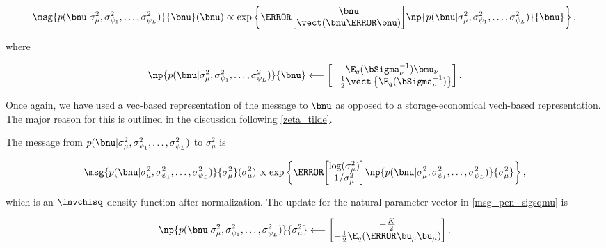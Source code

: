 \documentclass[12pt]{article}
\def\Sigmanu{\bSigma_{\nu}}
\def\munu{\bmu_{\nu}}
\def\sigsqmu{\sigma^2_{\mu}}
\def\umu{\bu_\mu}
\newcommand\sigsqpsi[1]{\sigma^2_{\psi_{#1}}}
\theoremstyle{plain}
\theoremstyle{definition}
\theoremstyle{remark}
\begin{document}
\begin{equation}
	\msg{p (\bnu | \sigsqmu, \sigsqpsi{1}, \dots, \sigsqpsi{L})}{\bnu} (\bnu)
		\propto
			\exp \left\{
				\T{\begin{bmatrix}
					\bnu \\
					\vect (\bnu \T{\bnu})
				\end{bmatrix}}
				\np{p (\bnu | \sigsqmu, \sigsqpsi{1}, \dots, \sigsqpsi{L})}{\bnu}
			\right\},
\label{msg_pen_nu}
\end{equation}

\noindent where

\begin{equation}
	\np{p (\bnu | \sigsqmu, \sigsqpsi{1}, \dots, \sigsqpsi{L})}{\bnu}
		\longleftarrow
			\begin{bmatrix}
				\E_q (\Sigmanu^{-1}) \munu \\
				-\frac12 \vect \left\{ \E_q (\Sigmanu^{-1}) \right\}
			\end{bmatrix}.
\label{np_pen_nu}
\end{equation}

\noindent Once again, we have used a vec-based representation of the message to $\bnu$ as opposed to
a storage-economical vech-based representation. The major reason for this is outlined in the discussion following
\eqref{zeta_tilde}.

The message from $p (\bnu | \sigsqmu, \sigsqpsi{1}, \dots, \sigsqpsi{L})$ to $\sigsqmu$ is

\begin{equation}
	\msg{p (\bnu | \sigsqmu, \sigsqpsi{1}, \dots, \sigsqpsi{L})}{\sigsqmu} (\sigsqmu)
		\propto
			\exp \left\{
				\T{\begin{bmatrix}
					\log (\sigsqmu) \\
					1/\sigsqmu
				\end{bmatrix}} 
				\np{p (\bnu | \sigsqmu, \sigsqpsi{1}, \dots, \sigsqpsi{L})}{\sigsqmu}
			\right\},
\label{msg_pen_sigsqmu}
\end{equation}

\noindent which is an $\invchisq$ density function after normalization. The update for the natural parameter vector
in \eqref{msg_pen_sigsqmu} is

\begin{equation}
	\np{p (\bnu | \sigsqmu, \sigsqpsi{1}, \dots, \sigsqpsi{L})}{\sigsqmu}
		\longleftarrow
			\begin{bmatrix}
				-\frac{K}{2} \\
				-\frac12 \E_q (\T{\umu} \umu)
			\end{bmatrix}.
\label{np_pen_sigsqmu}
\end{equation}
\end{document}
